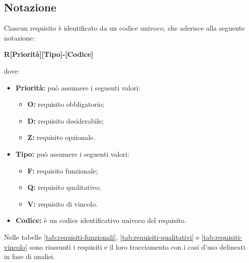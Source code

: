 \subsection{Notazione}
Ciascun requisito è identificato da un codice univoco, che aderisce alla
seguente notazione:
\begin{center}
    \textbf{R[Priorità][Tipo]-[Codice]}
\end{center}
dove:
\begin{itemize}
    \item \textbf{Priorità:} può assumere i seguenti valori:
          \begin{itemize}
              \item \textbf{O:} requisito obbligatorio;
              \item \textbf{D:} requisito desiderabile;
              \item \textbf{Z:} requisito opzionale.
          \end{itemize}
          \newpage
    \item \textbf{Tipo:} può assumere i seguenti valori:
          \begin{itemize}
              \item \textbf{F:} requisito funzionale;
              \item \textbf{Q:} requisito qualitativo;
              \item \textbf{V:} requisito di vincolo.
          \end{itemize}
    \item \textbf{Codice:} è un codice identificativo univoco del requisito.
\end{itemize}

Nelle tabelle \ref{tab:requisiti-funzionali}, \ref{tab:requisiti-qualitativi} e
\ref{tab:requisiti-vincolo} sono riassunti i requisiti e il loro tracciamento
con i casi d'uso delineati in fase di analisi.
\newpage

